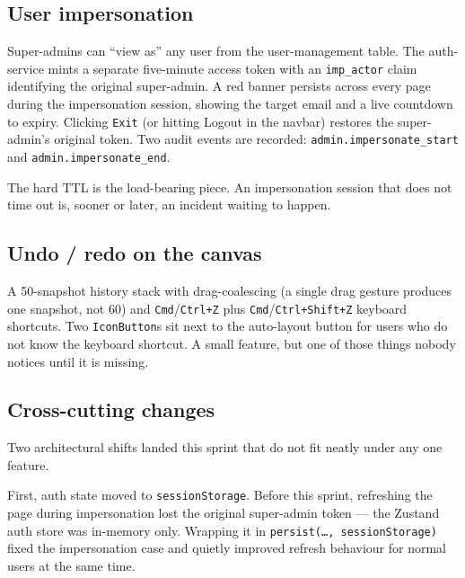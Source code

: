 \documentclass[12pt, a4paper, oneside]{report}
\begin{document}
\subsection{User impersonation}

Super-admins can ``view as'' any user from the user-management
table. The auth-service mints a separate five-minute access token
with an \texttt{imp\_actor} claim identifying the original
super-admin. A red banner persists across every page during the
impersonation session, showing the target email and a live
countdown to expiry. Clicking \texttt{Exit} (or hitting Logout in
the navbar) restores the super-admin's original token. Two audit
events are recorded: \texttt{admin.impersonate\_start} and
\texttt{admin.impersonate\_end}.

The hard TTL is the load-bearing piece. An impersonation session
that does not time out is, sooner or later, an incident waiting to
happen.


\subsection{Undo / redo on the canvas}

A 50-snapshot history stack with drag-coalescing (a single drag
gesture produces one snapshot, not 60) and
\texttt{Cmd}/\texttt{Ctrl+Z} plus
\texttt{Cmd}/\texttt{Ctrl+Shift+Z} keyboard shortcuts. Two
\texttt{IconButton}s sit next to the auto-layout button for users
who do not know the keyboard shortcut. A small feature, but one of
those things nobody notices until it is missing.

\subsection{Cross-cutting changes}

Two architectural shifts landed this sprint that do not fit neatly
under any one feature.

First, auth state moved to \texttt{sessionStorage}. Before this
sprint, refreshing the page during impersonation lost the original
super-admin token --- the Zustand auth store was in-memory only.
Wrapping it in \texttt{persist(\ldots,\,sessionStorage)} fixed the
impersonation case and quietly improved refresh behaviour for normal
users at the same time.
\end{document}
